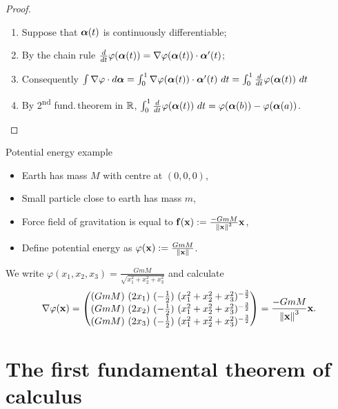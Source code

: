 \begin{proof}
    \begin{enumerate}
        \item Suppose that \(\boldsymbol{\alpha}(t)\) is continuously differentiable;
        \item By the chain rule \(\frac{d}{dt} \varphi(\boldsymbol{\alpha}(t)) = \nabla \varphi(\boldsymbol{\alpha}(t))\cdot \boldsymbol{\alpha}'(t)\);
        \item Consequently \(\int \nabla \varphi \cdot d\aalpha
              = \int_0^1 \nabla \varphi(\aalpha(t)) \cdot \aalpha'(t)\ dt
              = \int_0^1 \tfrac{d}{dt} \varphi(\aalpha(t)) \ dt \)
        \item By 2\textsuperscript{nd} fund.\,theorem in \(\mathbb{R}\),
              \(\int_0^1 \tfrac{d}{dt} \varphi(\boldsymbol{\alpha}(t)) \ dt = \varphi(\boldsymbol{\alpha}(b)) - \varphi(\boldsymbol{\alpha}(a))\).
    \end{enumerate}
\end{proof}




{Potential energy example}

\begin{itemize}
    \item Earth has mass \(M\) with centre at \((0,0,0)\),
    \item Small particle close to earth has mass \(m\),
    \item Force field of gravitation is equal to
          \(\mathbf{f}(\mathbf{x}) := \frac{-GmM}{\left\|\mathbf{x}\right\|^3}\mathbf{x}\),
    \item Define potential energy as
          \(\varphi(\mathbf{x}):= \frac{GmM}{\left\|\mathbf{x}\right\|}\).
\end{itemize}

We write \(\varphi(x_1,x_2,x_3) = \frac{GmM}{\sqrt{x_1^2 + x_2^2 + x_3^2}}\)
and calculate
\[
    \nabla \varphi(\mathbf{x}) =
    \begin{pmatrix}
        {(GmM) \ (2x_1)} \ {(-\frac{1}{2}) \ (x_1^2 + x_2^2 + x_3^2)^{-\frac{3}{2}}} \\
        {(GmM) \ (2x_2)} \ {(-\frac{1}{2}) \ (x_1^2 + x_2^2 + x_3^2)^{-\frac{3}{2}}} \\
        {(GmM) \ (2x_3)} \ {(-\frac{1}{2}) \ (x_1^2 + x_2^2 + x_3^2)^{-\frac{3}{2}}}
    \end{pmatrix}
    =   \frac{-GmM}{\left\|\mathbf{x}\right\|^3}\mathbf{x}.
\]




\section{The first fundamental theorem of calculus}



